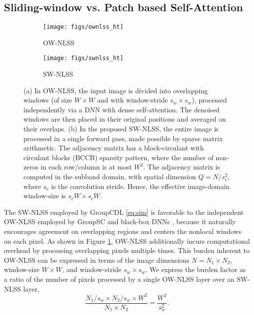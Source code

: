\documentclass[lettersize,journal]{IEEEtran}
\newcommand{\WINSZ}{W}
\newcommand{\WINSTRIDE}{s_w}
\begin{document}
\subsection{Sliding-window vs. Patch based Self-Attention} \label{sec:slidingwindow}
\begin{figure}[thb]
    \centering
    \begin{subfigure}{\linewidth}
        \centering
        \texttt{[image: figs/ownlss\_ht]}
        \caption{OW-NLSS}
        \vspace*{1em}
    \end{subfigure}
    \begin{subfigure}{\linewidth}
        \centering 
        \texttt{[image: figs/swnlss\_ht]}
        \caption{SW-NLSS}
    \end{subfigure}
    \caption{
        (a) In OW-NLSS, the input image is divided into overlapping windows (of size $W\times W$ and with window-stride $s_w \times s_w$), processed
        independently via a DNN with dense self-attention. The denoised windows
        are then placed in their original positions and averaged on their
        overlaps. (b) In the proposed SW-NLSS, the entire image is processed in a single forward pass, made possible by sparse matrix arithmetic. The
        adjacency matrix has a block-circulant with circulant blocks (BCCB)
        sparsity pattern, where the number of non-zeros in each row/column is
        at most $\WINSZ^2$. The adjacency matrix is computed in the subband
        domain, with spatial dimension $Q=N/s_c^2$, where $s_c$ is the
        convolution stride. Hence, the effective image-domain window-size is $s_cW \times s_cW$.
    }
    \label{fig:nlss}
\end{figure}
The SW-NLSS employed by GroupCDL \eqref{eq:sim} is favorable to the independent OW-NLSS employed by GroupSC
\cite{lecouat2020nonlocal} and black-box DNNs \cite{liu2018non, zhang2019residual}, 
because it naturally encourages agreement on overlapping regions and centers
the nonlocal windows on each pixel. 
As shown in Figure \ref{fig:nlss}, OW-NLSS additionally incurs computational
overhead by processing overlapping pixels multiple times. This burden inherent
to OW-NLSS can be expressed in terms of the image dimensions $N = N_1 \times N_2$,
window-size $\WINSZ \times \WINSZ$, and window-stride $\WINSTRIDE \times
\WINSTRIDE$. We express the burden factor as a ratio of the number of pixels
processed by a single OW-NLSS layer over an SW-NLSS layer,
\begin{equation} \label{eq:burden}
    \frac{N_1/\WINSTRIDE \times N_2/\WINSTRIDE \times \WINSZ^2}{N_1 \times N_2} = \frac{\WINSZ^2}{\WINSTRIDE^2}.
\end{equation}
\end{document}
